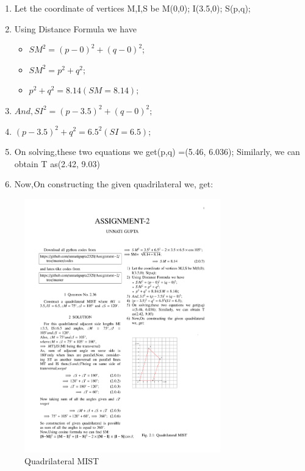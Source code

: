 \documentclass[journal,12pt,twocolumn]{IEEEtran}
\begin{document}
\begin{enumerate}
    \item Let the coordinate of vertices M,I,S be M(0,0); I(3.5,0); S(p,q);
    \item Using Distance Formula we have 
    \begin{itemize}
    \item ${SM^2}={(p-0)^2+(q-0)^2}$;
    \item $SM^2=p^2+q^2;$
    \item $p^2+q^2=8.14(SM=8.14);$
    \end{itemize}
    \item $And, SI^2=(p-3.5)^2+(q-0)^2;$
    \item $(p-3.5)^2+q^2 =6.5^2(SI=6.5);$
    \item On solving,these two equations we get(p,q) =(5.46, 6.036); Similarly, we can obtain  T as(2.42, 9.03)
    \item Now,On constructing the given  quadrilateral we, get:
\end{enumerate}
\begin{figure}[!ht]
\centering
\includegraphics[width=\columnwidth, height=11cm]{Assignment2.pdf}
\caption{Quadrilateral MIST}
\label{fig:Quadrilateral MIST}	
\end{figure}
\end{document}
